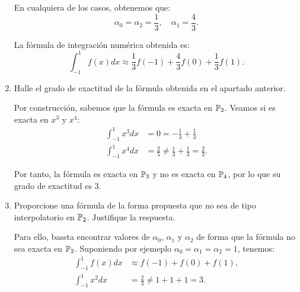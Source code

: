 \begin{ejercicio}
\begin{enumerate}
        En cualquiera de los casos, obtenemos que:
        \begin{equation*}
            \alpha_0 = \alpha_2 = \frac{1}{3},\quad \alpha_1 = \frac{4}{3}.
        \end{equation*}

        La fórmula de integración numérica obtenida es:
        \begin{equation*}
            \int_{-1}^{1} f(x) dx \approx \frac{1}{3} f(-1) + \frac{4}{3} f(0) + \frac{1}{3} f(1).
        \end{equation*}
        \item Halle el grado de exactitud de la fórmula obtenida en el apartado anterior.
        
        Por construcción, sabemos que la fórmula es exacta en $\mathbb{P}_2$. Veamos si es exacta en $x^3$ y $x^4$:
        \begin{align*}
            \int_{-1}^{1} x^3 dx &= 0= -\frac{1}{3}+\frac{1}{3}\\
            \int_{-1}^{1} x^4 dx &= \frac{2}{5} \neq \frac{1}{3} + \frac{1}{3} = \frac{2}{3}.
        \end{align*}

        Por tanto, la fórmula es exacta en $\mathbb{P}_3$ y no es exacta en $\mathbb{P}_4$, por lo que su grado de exactitud es 3.
        \item Proporcione una fórmula de la forma propuesta que no sea de tipo interpolatorio en $\mathbb{P}_2$. Justifique la respuesta.
        
        Para ello, bassta encontrar valores de $\alpha_0$, $\alpha_1$ y $\alpha_2$ de forma que la fórmula no sea exacta en $\mathbb{P}_2$. Suponiendo por ejemeplo $\alpha_0 = \alpha_1 = \alpha_2 = 1$, tenemos:
        \begin{align*}
            \int_{-1}^{1} f(x) dx &\approx f(-1) + f(0) + f(1),\\
            \int_{-1}^{1} x^2 dx &= \frac{2}{3} \neq 1 + 1 + 1 = 3.
        \end{align*}
    \end{enumerate}
\end{ejercicio}


